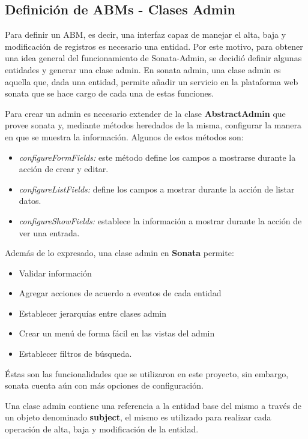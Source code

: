 
\subsection{Definición de ABMs - Clases Admin}%
\label{sub:definición_de_abms_clases_admin}

Para definir un ABM, es decir, una interfaz capaz de manejar el alta, baja y modificación de registros es necesario una entidad. Por este motivo, para obtener
una idea general del funcionamiento de Sonata-Admin, se decidió definir algunas entidades y generar una clase admin\@.
En sonata admin, una clase admin es aquella que, dada una entidad, permite añadir un servicio en la plataforma web sonata que se hace cargo de cada una de estas funciones.

Para crear un admin es necesario extender de la clase \textbf{AbstractAdmin} que provee sonata y, mediante métodos heredados de la misma, configurar la manera en
que se muestra la información\@.
Algunos de estos métodos son:

\begin{itemize}
    \item \textit{configureFormFields:} este método define los campos a mostrarse durante la acción de crear y editar.
    \item \textit{configureListFields:} define los campos a mostrar durante la acción de listar datos.
    \item \textit{configureShowFields:} establece la información a mostrar durante la acción de ver una entrada.
\end{itemize}

\noindent
Además de lo expresado, una clase admin en \textbf{Sonata} permite:
\begin{itemize}
    \item Validar información
    \item Agregar acciones de acuerdo a eventos de cada entidad
    \item Establecer jerarquías entre clases admin
    \item Crear un menú de forma fácil en las vistas del admin
    \item Establecer filtros de búsqueda.
\end{itemize}

Éstas son las funcionalidades que se utilizaron en este proyecto, sin embargo, sonata cuenta aún con más opciones de configuración.

Una clase admin contiene una referencia a la entidad base del mismo a través de un objeto denominado \textbf{subject}, el mismo es utilizado para realizar cada
operación de alta, baja y modificación de la entidad\@.

